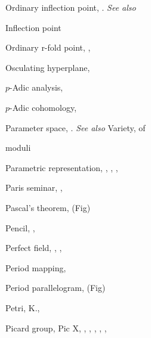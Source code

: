 {{\noindent\hspace*{0.0bp}Ordinary inflection point, . \emph{See also}\par
\noindent\hspace*{15.0bp}Inflection point\par
\noindent\hspace*{0.0bp}Ordinary r-fold point, , \par
\noindent\hspace*{0.0bp}Osculating hyperplane, \par
\vspace{8.55bp}
\noindent\hspace*{0.0bp}$p$-Adic analysis, \par
\noindent\hspace*{0.0bp}$p$-Adic cohomology, \par
\noindent\hspace*{0.0bp}Parameter space, . \emph{See also} Variety, of\par
\noindent\hspace*{15.0bp}moduli\par
\noindent\hspace*{0.0bp}Parametric representation, , , , \par
\noindent\hspace*{0.0bp}Paris seminar, , \par
\noindent\hspace*{0.0bp}Pascal's theorem,  (Fig)\par
\noindent\hspace*{0.0bp}Pencil, , \par
\noindent\hspace*{0.0bp}Perfect field, , , \par
\noindent\hspace*{0.0bp}Period mapping, \par
\noindent\hspace*{0.0bp}Period parallelogram,  (Fig)\par
\noindent\hspace*{0.0bp}Petri, K., \par
\noindent\hspace*{0.0bp}Picard group, Pic X, , , , , ,\par
}}
